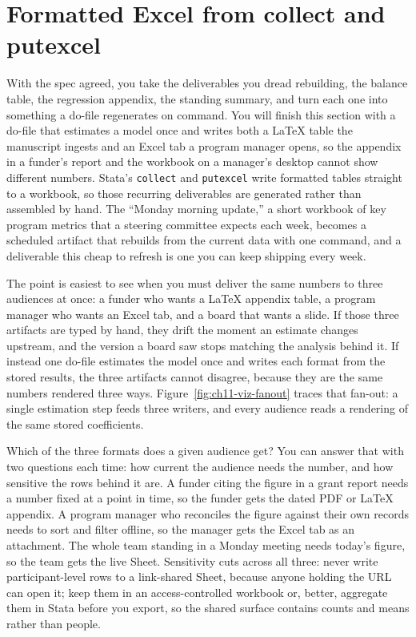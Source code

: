 \documentclass[
    a4paper,
    fontsize=10pt,
    twoside=true,
    numbers=noenddot,
]{kaobook}
\begin{document}
\section{Formatted Excel from collect and putexcel}
With the spec agreed, you take the deliverables you dread rebuilding, the balance table, the regression appendix, the standing summary, and turn each one into something a do-file regenerates on command. You will finish this section with a do-file that estimates a model once and writes both a \LaTeX{} table the manuscript ingests and an Excel tab a program manager opens, so the appendix in a funder's report and the workbook on a manager's desktop cannot show different numbers. Stata's \texttt{collect} and \texttt{putexcel} write formatted tables straight to a workbook, so those recurring deliverables are generated rather than assembled by hand. The \enquote{Monday morning update,} a short workbook of key program metrics that a steering committee expects each week, becomes a scheduled artifact that rebuilds from the current data with one command, and a deliverable this cheap to refresh is one you can keep shipping every week.

The point is easiest to see when you must deliver the same numbers to three audiences at once: a funder who wants a \LaTeX{} appendix table, a program manager who wants an Excel tab, and a board that wants a slide. If those three artifacts are typed by hand, they drift the moment an estimate changes upstream, and the version a board saw stops matching the analysis behind it. If instead one do-file estimates the model once and writes each format from the stored results, the three artifacts cannot disagree, because they are the same numbers rendered three ways. Figure~\ref{fig:ch11-viz-fanout} traces that fan-out: a single estimation step feeds three writers, and every audience reads a rendering of the same stored coefficients.

Which of the three formats does a given audience get? You can answer that with two questions each time: how current the audience needs the number, and how sensitive the rows behind it are. A funder citing the figure in a grant report needs a number fixed at a point in time, so the funder gets the dated PDF or \LaTeX{} appendix. A program manager who reconciles the figure against their own records needs to sort and filter offline, so the manager gets the Excel tab as an attachment. The whole team standing in a Monday meeting needs today's figure, so the team gets the live Sheet. Sensitivity cuts across all three: never write participant-level rows to a link-shared Sheet, because anyone holding the URL can open it; keep them in an access-controlled workbook or, better, aggregate them in Stata before you export, so the shared surface contains counts and means rather than people.
\end{document}
